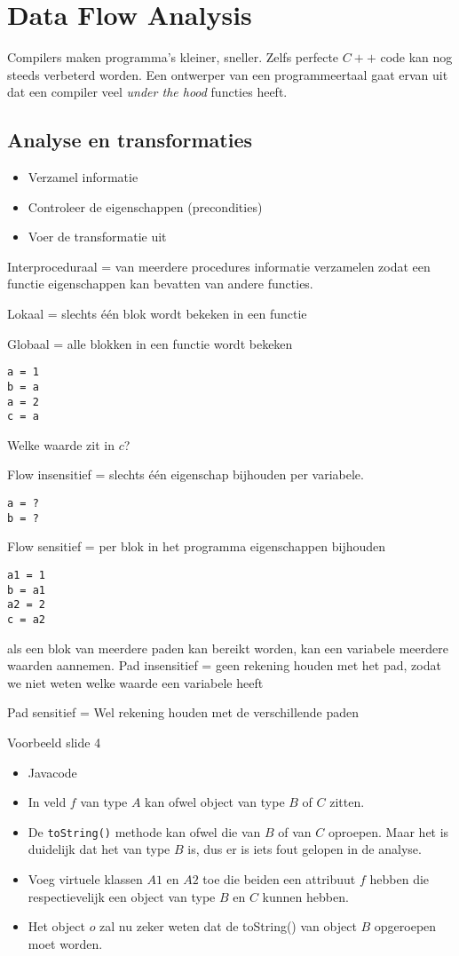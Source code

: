 \chapter{Data Flow Analysis}
\label{ch:data_flow_analysis}
Compilers maken programma's kleiner, sneller. Zelfs perfecte $C++$ code kan nog steeds verbeterd worden. Een ontwerper van een programmeertaal gaat ervan uit dat een compiler veel \textit{under the hood} functies heeft.


\section{Analyse en transformaties}
\begin{itemize}
	\item Verzamel informatie
	\item Controleer de eigenschappen (precondities)
	\item Voer de transformatie uit
\end{itemize}

Interproceduraal = van meerdere procedures informatie verzamelen zodat een functie eigenschappen kan bevatten van andere functies.

Lokaal = slechts één blok wordt bekeken in een functie

Globaal = alle blokken in een functie wordt bekeken


\begin{lstlisting}
a = 1
b = a
a = 2
c = a
\end{lstlisting}
Welke waarde zit in $c$? 

Flow insensitief = slechts één eigenschap bijhouden per variabele.
\begin{lstlisting}
a = ?
b = ?
\end{lstlisting}

Flow sensitief = per blok in het programma eigenschappen bijhouden
\begin{lstlisting}
a1 = 1
b = a1
a2 = 2
c = a2
\end{lstlisting}

als een blok van meerdere paden kan bereikt worden, kan een variabele meerdere waarden aannemen.
Pad insensitief =  geen rekening houden met het pad, zodat we niet weten welke waarde een variabele heeft



Pad sensitief = Wel rekening houden met de verschillende paden


Voorbeeld slide 4
\begin{itemize}
	\item Javacode
	\item In veld $f$ van type $A$ kan ofwel object van type $B$ of $C$ zitten.	
	\item De \texttt{toString()} methode kan ofwel die van $B$ of van $C$ oproepen. Maar het is duidelijk dat het van type $B$ is, dus er is iets fout gelopen in de analyse.
	\item Voeg virtuele klassen $A1$ en $A2$ toe die beiden een attribuut $f$ hebben die respectievelijk een object van type $B$ en $C$ kunnen hebben.
	\item Het object $o$ zal nu zeker weten dat de toString() van object $B$ opgeroepen moet worden.
\end{itemize}


